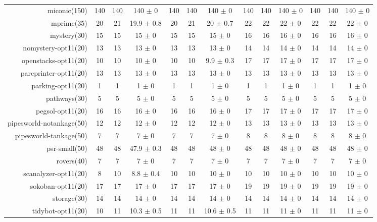 \begin{center}
\begin{tabular}{|r|*{4}{ccc|}}
miconic(150) & 140 & 140 & 140 \(\pm\) 0 & 140 & 140 & 140 \(\pm\) 0 & 140 & 140 & 140 \(\pm\) 0 & 140 & 140 & 140 \(\pm\) 0\\
mprime(35) & 20 & 21 & 19.9 \(\pm\) 0.8 & 20 & 21 & 20 \(\pm\) 0.7 & 22 & 22 & 22 \(\pm\) 0 & 22 & 22 & 22 \(\pm\) 0\\
mystery(30) & 15 & 15 & 15 \(\pm\) 0 & 15 & 15 & 15 \(\pm\) 0 & 16 & 16 & 16 \(\pm\) 0 & 16 & 16 & 16 \(\pm\) 0\\
nomystery-opt11(20) & 13 & 13 & 13 \(\pm\) 0 & 13 & 13 & 13 \(\pm\) 0 & 14 & 14 & 14 \(\pm\) 0 & 14 & 14 & 14 \(\pm\) 0\\
openstacks-opt11(20) & 10 & 10 & 10 \(\pm\) 0 & 10 & 10 & 9.9 \(\pm\) 0.3 & 17 & 17 & 17 \(\pm\) 0 & 17 & 17 & 17 \(\pm\) 0\\
parcprinter-opt11(20) & 13 & 13 & 13 \(\pm\) 0 & 13 & 13 & 13 \(\pm\) 0 & 13 & 13 & 13 \(\pm\) 0 & 13 & 13 & 13 \(\pm\) 0\\
parking-opt11(20) & 1 & 1 & 1 \(\pm\) 0 & 1 & 1 & 1 \(\pm\) 0 & 1 & 1 & 1 \(\pm\) 0 & 1 & 1 & 1 \(\pm\) 0\\
pathways(30) & 5 & 5 & 5 \(\pm\) 0 & 5 & 5 & 5 \(\pm\) 0 & 5 & 5 & 5 \(\pm\) 0 & 5 & 5 & 5 \(\pm\) 0\\
pegsol-opt11(20) & 16 & 16 & 16 \(\pm\) 0 & 16 & 16 & 16 \(\pm\) 0 & 17 & 17 & 17 \(\pm\) 0 & 17 & 17 & 17 \(\pm\) 0\\
pipesworld-notankage(50) & 12 & 12 & 12 \(\pm\) 0 & 12 & 12 & 12 \(\pm\) 0 & 13 & 13 & 13 \(\pm\) 0 & 13 & 13 & 13 \(\pm\) 0\\
pipesworld-tankage(50) & 7 & 7 & 7 \(\pm\) 0 & 7 & 7 & 7 \(\pm\) 0 & 8 & 8 & 8 \(\pm\) 0 & 8 & 8 & 8 \(\pm\) 0\\
psr-small(50) & 48 & 48 & 47.9 \(\pm\) 0.3 & 48 & 48 & 48 \(\pm\) 0 & 48 & 48 & 48 \(\pm\) 0 & 48 & 48 & 48 \(\pm\) 0\\
rovers(40) & 7 & 7 & 7 \(\pm\) 0 & 7 & 7 & 7 \(\pm\) 0 & 7 & 7 & 7 \(\pm\) 0 & 7 & 7 & 7 \(\pm\) 0\\
scanalyzer-opt11(20) & 8 & 10 & 8.8 \(\pm\) 0.4 & 10 & 10 & 10 \(\pm\) 0 & 10 & 10 & 10 \(\pm\) 0 & 10 & 10 & 10 \(\pm\) 0\\
sokoban-opt11(20) & 17 & 17 & 17 \(\pm\) 0 & 17 & 17 & 17 \(\pm\) 0 & 19 & 19 & 19 \(\pm\) 0 & 19 & 19 & 19 \(\pm\) 0\\
storage(30) & 14 & 14 & 14 \(\pm\) 0 & 14 & 14 & 14 \(\pm\) 0 & 14 & 14 & 14 \(\pm\) 0 & 14 & 14 & 14 \(\pm\) 0\\
tidybot-opt11(20) & 10 & 11 & 10.3 \(\pm\) 0.5 & 11 & 11 & 10.6 \(\pm\) 0.5 & 11 & 11 & 11 \(\pm\) 0 & 11 & 11 & 11 \(\pm\) 0\\

\end{tabular}
\end{center}
